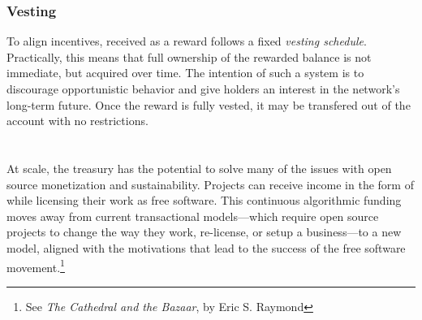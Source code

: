 \subsubsection{Vesting} To align incentives, \oscoin{} received
as a reward follows a fixed \emph{vesting schedule}. Practically, this means
that full ownership of the rewarded balance is not immediate, but acquired over time. The
intention of such a system is to discourage opportunistic behavior and give \oscoin{}
holders an interest in the network's long-term future. Once the reward is
fully vested, it may be transfered out of the account with no restrictions.
\label{s:vesting}

\section*{}

\noindent At scale, the \oscoin{} treasury has the potential to solve many of
the issues with open source monetization and sustainability. Projects can
receive income in the form of \oscoin{} while licensing their work as free
software. This continuous algorithmic funding moves
away from current transactional models---which require open source projects
to change the way they work, re-license, or setup a business---to a new model,
aligned with the motivations that lead to the success of the free software
movement.\footnote{See \emph{The Cathedral and the Bazaar}, by Eric S. Raymond}
